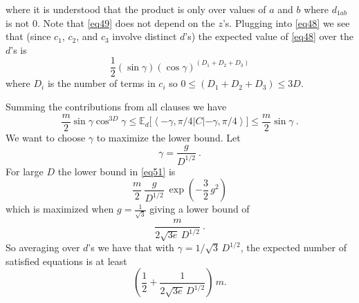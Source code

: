 \documentclass[t11pt,preprint,preprintnumbers]{revtex4}
\newcommand{\bra}[1]{\left\langle #1 \right|}
\newcommand{\ket}[1]{\left|#1\right\rangle}
\begin{document}
where it is understood that the product is only over values of $a$ and $b$ where $d_{1ab}$ is not $0$. Note that \eqref{eq49} does not depend on the $z$'s. Plugging into \eqref{eq48} we see that (since $c_1$, $c_2$, and $c_3$ involve distinct $d$'s) the expected value of \eqref{eq48} over the $d$'s is
\begin{equation}\label{eq50}
\frac{1}{2} (\sin \gamma) (\cos \gamma)^{(D_1 + D_2 +D_3)}
\end{equation}
where $D_i$ is the number of terms in $c_i$ so $0 \leqslant (D_1 + D_2 +D_3) \leqslant 3D$.

 Summing the contributions from all clauses we have
\begin{equation}\label{eq51}
\frac{m}{2} \sin \gamma \cos^{3D} \gamma \leqslant \mathbb{E}_d \Big[\bra{- \gamma,  \pi/4} C \ket{- \gamma,  \pi/4}\Big] \leqslant \frac{m}{2} \sin \gamma\ .
\end{equation}
We want to choose $\gamma$ to maximize the lower bound. Let
\begin{equation}\label{eq52}
\gamma = \frac{g}{D^{1/2}} \ .
\end{equation}
For large $D$ the lower bound in \eqref{eq51}  is 
\begin{equation}\label{eq53}
\frac{m}{2}\ \frac{g}{D^{1/2}} \ \exp \left(-\frac{3}{2} \, g^2 \right)
\end{equation}
which is maximized when $g = \frac{1}{\sqrt{3}}$ giving a lower bound of
\begin{equation}\label{eq54}
\frac{m}{2\sqrt{3e}\, D^{1/2}} \ .
\end{equation}
So averaging over $d$'s we have that with $\gamma = 1/\sqrt{3}\, D^{1/2}$, the expected number of satisfied equations is  at least
\begin{equation}\label{eq55}
\left(\frac{1}{2} + \frac{1}{2\sqrt{3e}\, D^{1/2}} \right) \, m.
\end{equation}
\end{document}
